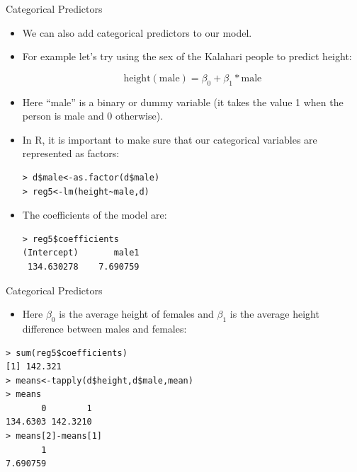 \documentclass[handout]{beamer}
\begin{document}
\begin{frame}[fragile]{Categorical Predictors}
\scriptsize{ 
\begin{itemize}
 \item We can also add categorical predictors to our model. 
 
 \item For example let's try using the sex of the Kalahari people to predict height: 


  \begin{displaymath}
  \text{height}(\text{male})=\beta_0+\beta_1*\text{male}
 \end{displaymath} 

 \item Here ``male'' is a binary or dummy variable (it takes the value 1 when the person is male and 0 otherwise).
 
 \item In R, it is important to make sure that our categorical variables are represented as factors:
 
 \begin{verbatim}
> d$male<-as.factor(d$male)
> reg5<-lm(height~male,d)
\end{verbatim}

\item The coefficients of the model are:

\begin{verbatim}
> reg5$coefficients
(Intercept)       male1 
 134.630278    7.690759  
\end{verbatim}


 
\end{itemize}





}
\end{frame}


\begin{frame}[fragile]{Categorical Predictors}
\scriptsize{ 
\begin{itemize}
\item Here $\beta_0$ is the average height of females and $\beta_1$ is the average height difference  between males and females:
 
\end{itemize}

\begin{verbatim}
> sum(reg5$coefficients)
[1] 142.321
> means<-tapply(d$height,d$male,mean)
> means
       0        1 
134.6303 142.3210
> means[2]-means[1]
       1 
7.690759 
\end{verbatim}



}
\end{frame}
\end{document}
